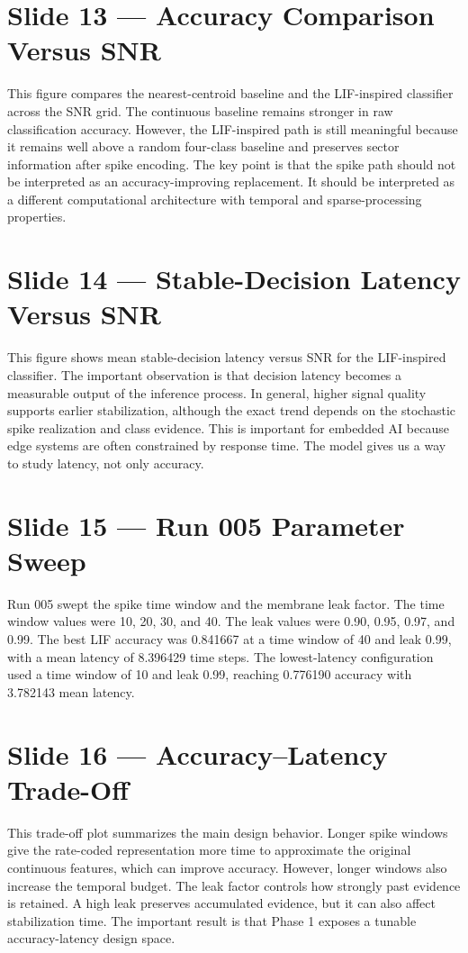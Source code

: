 \documentclass[11pt]{article}
\begin{document}
\section*{Slide 13 — Accuracy Comparison Versus SNR}
This figure compares the nearest-centroid baseline and the LIF-inspired classifier across the SNR grid. The continuous baseline remains stronger in raw classification accuracy. However, the LIF-inspired path is still meaningful because it remains well above a random four-class baseline and preserves sector information after spike encoding. The key point is that the spike path should not be interpreted as an accuracy-improving replacement. It should be interpreted as a different computational architecture with temporal and sparse-processing properties.

\section*{Slide 14 — Stable-Decision Latency Versus SNR}
This figure shows mean stable-decision latency versus SNR for the LIF-inspired classifier. The important observation is that decision latency becomes a measurable output of the inference process. In general, higher signal quality supports earlier stabilization, although the exact trend depends on the stochastic spike realization and class evidence. This is important for embedded AI because edge systems are often constrained by response time. The model gives us a way to study latency, not only accuracy.

\section*{Slide 15 — Run 005 Parameter Sweep}
Run 005 swept the spike time window and the membrane leak factor. The time window values were 10, 20, 30, and 40. The leak values were 0.90, 0.95, 0.97, and 0.99. The best LIF accuracy was 0.841667 at a time window of 40 and leak 0.99, with a mean latency of 8.396429 time steps. The lowest-latency configuration used a time window of 10 and leak 0.99, reaching 0.776190 accuracy with 3.782143 mean latency.

\section*{Slide 16 — Accuracy--Latency Trade-Off}
This trade-off plot summarizes the main design behavior. Longer spike windows give the rate-coded representation more time to approximate the original continuous features, which can improve accuracy. However, longer windows also increase the temporal budget. The leak factor controls how strongly past evidence is retained. A high leak preserves accumulated evidence, but it can also affect stabilization time. The important result is that Phase 1 exposes a tunable accuracy-latency design space.
\end{document}
